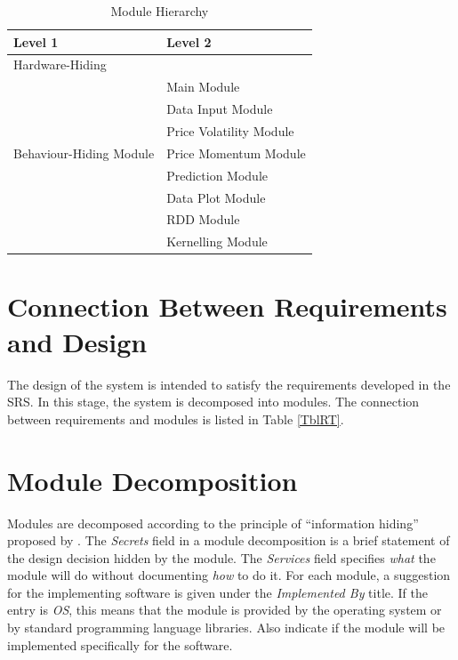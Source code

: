 \documentclass[12pt, titlepage]{article}
\begin{document}
\begin{table}[h!]
\centering
\begin{tabular}{p{} p{}}
\toprule
\textbf{Level 1} & \textbf{Level 2} \\
\midrule

{Hardware-Hiding} & ~ \\
\midrule


\multirow{7}{0.3\textwidth}{Behaviour-Hiding Module}
& Main Module\\
& Data Input Module\\
& Price Volatility Module\\
& Price Momentum Module\\
& Prediction Module\\
& Data Plot Module\\
\midrule

\multirow{1}{0.3\textwidth}{Software Decision Module}& RDD Module\\ 
&Kernelling Module\\

\bottomrule

\end{tabular}
\caption{Module Hierarchy}
\label{TblMH}
\end{table}

\section{Connection Between Requirements and Design} \label{SecConnection}

The design of the system is intended to satisfy the requirements developed in
the SRS. In this stage, the system is decomposed into modules. The connection
between requirements and modules is listed in Table \ref{TblRT}.

\section{Module Decomposition} \label{SecMD}

Modules are decomposed according to the principle of ``information hiding''
proposed by \citet{ParnasEtAl1984}. The \emph{Secrets} field in a module
decomposition is a brief statement of the design decision hidden by the
module. The \emph{Services} field specifies \emph{what} the module will do
without documenting \emph{how} to do it. For each module, a suggestion for the
implementing software is given under the \emph{Implemented By} title. If the
entry is \emph{OS}, this means that the module is provided by the operating
system or by standard programming language libraries. Also indicate if the
module will be implemented specifically for the software.
\end{document}
